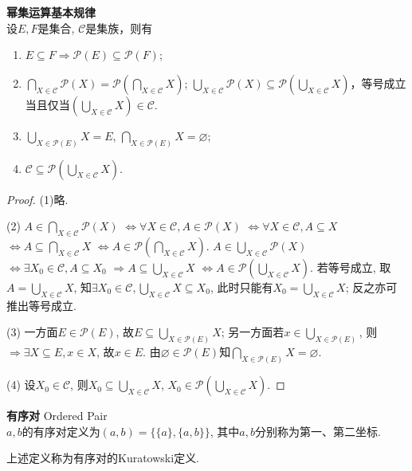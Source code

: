 \begin{pro}\textbf{幂集运算基本规律}\\
设$E,F$是集合, $\mathcal{C}$是集族，则有
\begin{enumerate}
    \item $E\subseteq F \Rightarrow \mathcal{P}(E)\subseteq \mathcal{P}(F)$;
    \item $\bigcap_{X\in \mathcal{C}} \mathcal{P}(X)=\mathcal{P}(\bigcap_{X\in \mathcal{C}} X)$; $\bigcup_{X\in \mathcal{C}} \mathcal{P}(X)\subseteq \mathcal{P}(\bigcup_{X\in \mathcal{C}} X)$，等号成立当且仅当$(\bigcup_{X\in \mathcal{C}} X) \in \mathcal{C}$. 
    \item $\bigcup_{X\in \mathcal{P}(E)} X =E$, $\bigcap_{X\in \mathcal{P}(E)} X =\varnothing$;
    \item $\mathcal{C}\subseteq \mathcal{P}(\bigcup_{X\in \mathcal{C}} X)$.
\end{enumerate}
\end{pro}
\begin{proof}
\par (1)略. 
\par (2) $A\in \bigcap_{X\in \mathcal{C}} \mathcal{P}(X)$  $\Leftrightarrow \forall X\in \mathcal{C}, A\in  \mathcal{P}(X)$  $\Leftrightarrow \forall X\in \mathcal{C}, A\subseteq X$ $\Leftrightarrow A \subseteq \bigcap_{X\in \mathcal{C}} X$ $\Leftrightarrow A \in \mathcal{P}(\bigcap_{X\in \mathcal{C}} X)$. 
$A\in \bigcup_{X\in \mathcal{C}} \mathcal{P}(X)$  $\Leftrightarrow \exists X_0\in \mathcal{C}, A\subseteq X_0$  $\Rightarrow A \subseteq \bigcup_{X\in \mathcal{C}} X$ $\Leftrightarrow A \in \mathcal{P}(\bigcup_{X\in \mathcal{C}} X)$. 若等号成立, 取$A=\bigcup_{X\in \mathcal{C}} X$, 知$\exists X_0 \in \mathcal{C}, \bigcup_{X\in \mathcal{C}} X\subseteq X_0$, 此时只能有$X_0=\bigcup_{X\in \mathcal{C}} X$; 反之亦可推出等号成立.
\par (3) 一方面$E\in \mathcal{P}(E)$, 故$E\subseteq \bigcup_{X\in \mathcal{P}(E)} X$; 另一方面若$x\in \bigcup_{X\in \mathcal{P}(E)}$, 则$\Rightarrow \exists X\subseteq E, x\in X$, 故$x\in E$. 由$\varnothing \in \mathcal{P}(E)$知$\bigcap_{X\in \mathcal{P}(E)} X =\varnothing$.
\par (4) 设$X_0\in \mathcal{C}$, 则$X_0\subseteq \bigcup_{X\in \mathcal{C}} X$, $X_0 \in \mathcal{P}(\bigcup_{X\in \mathcal{C}} X)$.
\end{proof}

\begin{dfn} \textbf{有序对} Ordered Pair\\
$a,b$的有序对定义为$(a,b)=\{\{a\},\{a,b\}\}$, 其中$a,b$分别称为第一、第二坐标. 
\end{dfn}
上述定义称为有序对的Kuratowski定义. 

